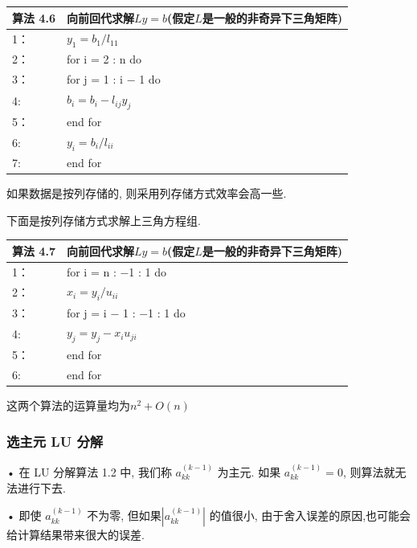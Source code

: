 \documentclass[12pt,a4paper]{article}
\begin{document}
\begin{table}  
	\begin{tabular*}{16cm}{ll}  
		\hline  
		算法 4.6 &向前回代求解$Ly =b$(假定$L$是一般的非奇异下三角矩阵)\\  
		\hline  
		1：   &$y_{1}=b_{1} / l_{11}$\\  
		2：   & for i = 2 : n do\\
		3：   & \qquad for j = 1 : i − 1 do\\
		4:    & \qquad \qquad$b_{i}=b_{i}-l_{i j} y_{j}$\\
		5：   & \qquad end for\\
		6:    & \qquad $y_{i}=b_{i} / l_{i i}$\\
		7:    & end for\\
		\hline  
	\end{tabular*}  
\end{table}

如果数据是按列存储的, 则采用列存储方式效率会高一些.

下面是按列存储方式求解上三角方程组.

\begin{table}  
	\begin{tabular*}{16cm}{ll}  
		\hline  
		算法 4.7 &向前回代求解$Ly =b$(假定$L$是一般的非奇异下三角矩阵)\\  
		\hline  
		1：   & for i = n : −1 : 1 do\\  
		2：   & \qquad $x_{i}=y_{i} / u_{i i}$\\
		3：   & \qquad for j = i − 1 : −1 : 1 do\\
		4:    & \qquad \qquad$y_{j}=y_{j}-x_{i} u_{j i}$\\
		5：   & \qquad end for\\
		6:    & end for\\
		\hline  
	\end{tabular*}  
\end{table}

这两个算法的运算量均为$n^2+O(n)$

\subsubsection{选主元 LU 分解}
• 在 LU 分解算法 1.2 中, 我们称 $a_{k k}^{(k-1)}$ 为主元. 如果 $a_{k k}^{(k-1)}=0$, 则算法就无法进行下去.

• 即使 $a_{k k}^{(k-1)}$ 不为零, 但如果$\left|a_{k k}^{(k-1)}\right|$ 的值很小, 由于舍入误差的原因,也可能会给计算结果带来很大的误差.
\end{document}
